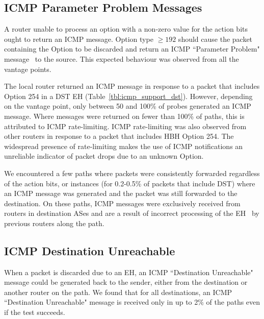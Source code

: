 \documentclass[conference]{IEEEtran}
\begin{document}
\subsection{ICMP Parameter Problem Messages}


A router unable to process an option with a non-zero value
for the action bits ought to return an ICMP message.
Option type $\ge 192$ should cause the packet containing the Option to be discarded and
return an ICMP ``Parameter Problem" message~\cite{rfc8200} to the source.
This expected behaviour was observed from all the vantage points. 

The local router returned an ICMP message in response to a packet that includes Option 254 in a DST EH
(Table~\ref{tbl:icmp_support_dst}).  However, depending on the vantage point, only between 50 and 100\% of
probes generated an ICMP message.
Where messages were returned on fewer than 100\% of paths, this is attributed to ICMP
rate-limiting.  ICMP rate-limiting was
also observed from other routers in response to a packet that includes HBH Option 254. The widespread presence of
rate-limiting makes the use of ICMP notifications an unreliable
indicator of packet drops due to an unknown Option.

We encountered a few paths where packets were consistently
forwarded regardless of the action bits, or instances (for 0.2-0.5\% of packets that include DST) where an ICMP message
was generated and the packet was still forwarded to the destination. 
On these paths, ICMP messages were exclusively received from
routers in destination ASes and are a result of incorrect processing of the EH~\cite{rfc8200} by previous routers along the path.


\subsection{ICMP Destination Unreachable}

When a packet is discarded due to an EH, an ICMP ``Destination Unreachable"
message could be generated back to the sender, either from the destination or another router on the path.
We found that for all destinations, an ICMP
``Destination Unreachable" message is received only in up to 2\% of the paths
even if the test succeeds.  
\end{document}
